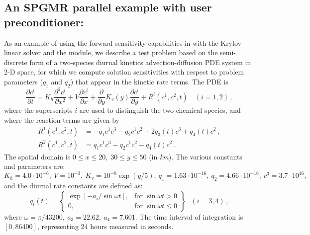 \newpage
\subsection{An SPGMR parallel example with user preconditioner: }
\label{ss:pvfkx}

As an example of using the forward sensitivity capabilities in {\cvodes} 
with the Krylov linear solver {\cvspgmr} and the {\nvecp} module, 
we describe a test problem based on the
semi-discrete form of a two-species diurnal kinetics advection-diffusion PDE 
system in 2-D space, for which we compute solution sensitivities with respect to 
problem parameters ($q_1$ and $q_2$) that appear in the kinetic rate terms.
The PDE is
\begin{equation}\label{e:pvfkx_PDE}
  \frac{\partial c^i}{\partial t} = K_h\frac{\partial^2 c^i}{\partial x^2}
  +V \frac{\partial c^i}{\partial x}
  + \frac{\partial} {\partial y} K_v(y) \frac{\partial c^i}{\partial y}
  + R^i(c^1,c^2,t) \quad (i=1,2) \, ,
\end{equation}
where the superscripts $i$ are used to distinguish the two chemical
species, and where the reaction terms are given by
\begin{equation}\label{e:pvfkx_R}
  \begin{split}
    R^1(c^1,c^2,t) & = -q_1c^1c^3-q_2c^1c^2+2q_3(t)c^3+q_4(t)c^2 ~, \\
    R^2(c^1,c^2,t) & = q_1c^1c^3-q_2c^1c^2-q_4(t)c^2 ~.
  \end{split}
\end{equation}
The spatial domain is $0 \leq x \leq 20,\;30 \leq y \leq 50$ (in {\em km}). 
The various constants and parameters are: $K_h=4.0\cdot 10^{-6},
~ V=10^{-3},~ K_v=10^{-8}\exp (y/5),~ q_1=1.63\cdot 10^{-16},
~ q_2=4.66\cdot 10^{-16},~ c^3=3.7\cdot 10^{16},$ and the diurnal
rate constants are defined as:
\begin{equation*}
  q_i(t) = 
  \left\{ \begin{array}{ll}
      \exp [-a_i/\sin \omega t], & \mbox{for } \sin \omega t>0 \\
      0, & \mbox{for } \sin \omega t\leq 0
    \end{array} \right\} ~~~(i=3,4) \, ,
\end{equation*}
where $\omega =\pi /43200, ~ a_3=22.62,~ a_4=7.601.$  The time interval of
integration is $[0, 86400]$, representing 24 hours measured in seconds.

